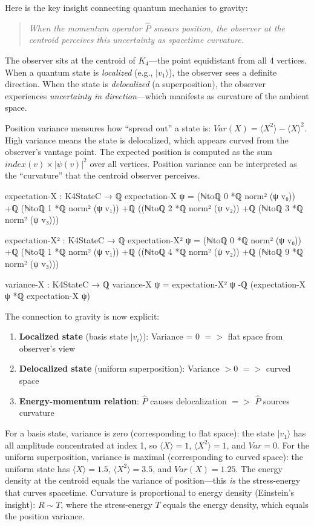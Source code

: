 \documentclass[11pt,a4paper]{book}
\def\Rightarrow{=>}%
\def\text#1{#1}%
\begin{document}
Here is the key insight connecting quantum mechanics to gravity:
\begin{quote}
\emph{When the momentum operator $\hat{P}$ smears position, the observer at the centroid perceives 
this uncertainty as spacetime curvature.}
\end{quote}

The observer sits at the centroid of $K_4$---the point equidistant from all 4 vertices.
When a quantum state is \emph{localized} (e.g., $|v_1\rangle$), the observer
sees a definite direction. When the state is \emph{delocalized} (a superposition),
the observer experiences \emph{uncertainty in direction}---which manifests as
curvature of the ambient space.

Position variance measures how ``spread out'' a state is: $\text{Var}(X) = \langle X^2\rangle - \langle X\rangle^2$. High variance means the state is delocalized, which appears curved from the observer's vantage point. The expected position is computed as the sum $\text{index}(v) \times |\psi(v)|^2$ over all vertices. Position variance can be interpreted as the ``curvature'' that the centroid observer perceives.

\begin{code}
expectation-X : K4StateC → ℚ
expectation-X ψ = (ℕtoℚ 0 *ℚ norm² (ψ v₀)) +ℚ (ℕtoℚ 1 *ℚ norm² (ψ v₁))
              +ℚ ((ℕtoℚ 2 *ℚ norm² (ψ v₂)) +ℚ (ℕtoℚ 3 *ℚ norm² (ψ v₃)))

expectation-X² : K4StateC → ℚ
expectation-X² ψ = (ℕtoℚ 0 *ℚ norm² (ψ v₀)) +ℚ (ℕtoℚ 1 *ℚ norm² (ψ v₁))
               +ℚ ((ℕtoℚ 4 *ℚ norm² (ψ v₂)) +ℚ (ℕtoℚ 9 *ℚ norm² (ψ v₃)))

variance-X : K4StateC → ℚ
variance-X ψ = expectation-X² ψ -ℚ (expectation-X ψ *ℚ expectation-X ψ)
\end{code}

The connection to gravity is now explicit:

\begin{enumerate}
\item \textbf{Localized state} (basis state $|v_i\rangle$): 
      Variance = 0 $\Rightarrow$ flat space from observer's view
\item \textbf{Delocalized state} (uniform superposition): 
      Variance $> 0$ $\Rightarrow$ curved space
\item \textbf{Energy-momentum relation}: 
      $\hat{P}$ causes delocalization $\Rightarrow$ $\hat{P}$ sources curvature
\end{enumerate}

For a basis state, variance is zero (corresponding to flat space): the state $|v_1\rangle$ has all amplitude concentrated at index 1, so $\langle X\rangle = 1$, $\langle X^2\rangle = 1$, and $\text{Var} = 0$. For the uniform superposition, variance is maximal (corresponding to curved space): the uniform state has $\langle X\rangle = 1.5$, $\langle X^2\rangle = 3.5$, and $\text{Var}(X) = 1.25$. The energy density at the centroid equals the variance of position---this \emph{is} the stress-energy that curves spacetime. Curvature is proportional to energy density (Einstein's insight): $R \sim T$, where the stress-energy $T$ equals the energy density, which equals the position variance.
\end{document}
